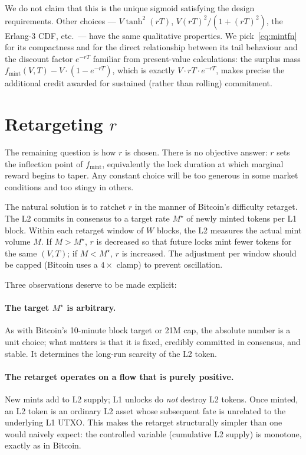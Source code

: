\documentclass[11pt,a4paper]{article}
\newcommand{\fmint}{f_{\mathrm{mint}}}
\begin{document}
\noindent We do not claim that this is the unique sigmoid satisfying the design requirements. Other choices --- $V \tanh^2(rT)$, $V (rT)^2 / (1 + (rT)^2)$, the Erlang-3 CDF, etc.~--- have the same qualitative properties. We pick~\eqref{eq:mintfn} for its compactness and for the direct relationship between its tail behaviour and the discount factor $e^{-rT}$ familiar from present-value calculations: the surplus mass $\fmint(V,T) - V \cdot (1 - e^{-rT})$, which is exactly $V \cdot rT \cdot e^{-rT}$, makes precise the additional credit awarded for sustained (rather than rolling) commitment.

\section{Retargeting $r$}
\label{sec:retarget}

The remaining question is how $r$ is chosen. There is no objective answer: $r$ sets the inflection point of $\fmint$, equivalently the lock duration at which marginal reward begins to taper. Any constant choice will be too generous in some market conditions and too stingy in others.

The natural solution is to ratchet $r$ in the manner of Bitcoin's difficulty retarget. The L2 commits in consensus to a target rate $M^\star$ of newly minted tokens per L1 block. Within each retarget window of $W$ blocks, the L2 measures the actual mint volume $M$. If $M > M^\star$, $r$ is decreased so that future locks mint fewer tokens for the same $(V, T)$; if $M < M^\star$, $r$ is increased. The adjustment per window should be capped (Bitcoin uses a $4\times$ clamp) to prevent oscillation.

Three observations deserve to be made explicit:

\paragraph{The target $M^\star$ is arbitrary.} As with Bitcoin's 10-minute block target or 21M cap, the absolute number is a unit choice; what matters is that it is fixed, credibly committed in consensus, and stable. It determines the long-run scarcity of the L2 token.

\paragraph{The retarget operates on a flow that is purely positive.} New mints add to L2 supply; L1 unlocks do \emph{not} destroy L2 tokens. Once minted, an L2 token is an ordinary L2 asset whose subsequent fate is unrelated to the underlying L1 UTXO. This makes the retarget structurally simpler than one would naively expect: the controlled variable (cumulative L2 supply) is monotone, exactly as in Bitcoin.
\end{document}
